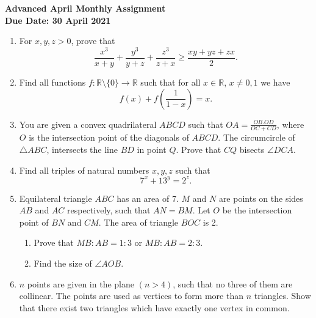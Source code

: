 \documentclass{article}
\begin{document}
\thispagestyle{empty}

\begin{center}
  \textbf{\Large Advanced April Monthly Assignment}
  \\ \vspace{1em}
  \textbf{\large Due Date: 30 April 2021}
\end{center}

\vspace{12pt}

\begin{enumerate}[itemsep=18pt]

\vspace{6pt}
\item %
For $x,y,z > 0$, prove that
\[ \frac{x^3}{x+y} +\frac{y^3}{y+z} +\frac{z^3}{z+x} \geq \frac{xy+yz+zx}{2}. \]


\item %
Find all functions $f:\mathbb{R}\setminus\{0\} \to \mathbb{R}$ such that for all $x \in \mathbb{R}$, $x \neq 0,1$ we have
\[ f(x) +f\left(\frac{1}{1-x}\right) = x. \]


\item %
You are given a convex quadrilateral $ABCD$ such that $OA = \frac{OB.OD}{OC+CD}$, where $O$ is the intersection point of the diagonals of $ABCD$.
The circumcircle of $\triangle ABC$, intersects the line $BD$ in point $Q$.
Prove that $CQ$ bisects $\angle DCA.$


\item %
Find all triples of natural numbers $x,y,z$ such that $$7^x +13^y = 2^z.$$


\item %
Equilateral triangle $ABC$ has an area of 7.
$M$ and $N$ are points on the sides $AB$ and $AC$ respectively, such that $AN = BM$.
Let $O$ be the intersection point of $BN$ and $CM$.
The area of triangle $BOC$ is 2.
\begin{enumerate}
	\item Prove that $MB:AB = 1:3$ or $MB:AB = 2:3$.
	\item Find the size of $\angle AOB$.
\end{enumerate}


\item %
$n$ points are given in the plane $(n > 4)$, such that no three of them are collinear.
The points are used as vertices to form more than $n$ triangles.
Show that there exist two triangles which have exactly one vertex in common.

\end{enumerate}
\end{document}
